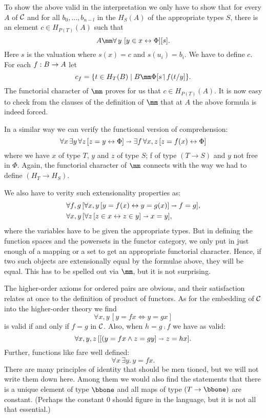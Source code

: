 To show the above valid in the interpretation we only have to show that for every $A$ of
$\mathcal C$ and for all $b_0, \dots ,b_{n-l}$ in the $H_S(A)$ of the appropriate types $S$, there
is an element $c \in H_{P(T)}(A)$ such that
$$
A \mm \forall\, y \,\, [y \in x \iff \Phi][s] .
$$
%
Here $s$ is the valuation where $s(x) = c$ and $s(u_i) = b_i$. We have to define $c$. For
each $f: B \rightarrow A$ let
$$
c_f = \{t \in H_T(B) \mid B \mm \Phi [s \res f(t/y] \} .
$$
%
The functorial character of $\mm$ proves for us that $c \in H_{P(T)}(A)$. It is now easy
to check from the clauses of the definition of $\mm$ that at $A$ the above formula is
indeed forced.

In a similar way we can verify the functional version of comprehension:
$$
\forall x \, \exists y \, \forall z \, [ z = y \leftrightarrow \Phi] \shortrightarrow \exists f\, \forall x,z\, [z = f(x) \leftrightarrow \Phi ]
$$
%
where we have $x$ of type $T$, $y$ and $z$ of type $S$; f of type $(T\to S)$ and $y$ not
free in $\Phi$. Again, the functorial character of $\mm$ connects with the way we had to
define $(H_T \to H_S)$.

We also have to verity such extensionality properties as:
\begin{align*}
&\forall f,g \, [\forall x,y \, [ y = f(x) \leftrightarrow y = g(x) ] \shortrightarrow f = g],\\
&\forall x,y \, [\forall z \, [ z \in x \leftrightarrow z \in y ] \shortrightarrow x = y],
\end{align*}
%
where the variables have to be given the appropriate types. But in defining the function
spaces and the powersets in the functor category, we only put in just enough of a mapping
or a set to get an appropriate functorial character. Hence, if two such objects are
extensionally equal by the formulae above, they will be equal. This has to be spelled out
via $\mm$, but it is not surprising.

The higher-order axioms for ordered pairs are obvious, and their satisfaction relates at
once to the definition of product of functors. As for the embedding of $\mathcal C$ into the
higher-order theory we find
$$
\forall x,y \, [y = f x \iff y = gx]
$$
is valid if and only if $f = g$ in $\mathcal C$. Also, when $h = g \comp f$ we have as valid:
$$
\forall x,y,z\, [[(y = fx \land z = gy] \shortrightarrow z = hx].
$$
Further, functions like fare well defined:
$$
\forall x\, \exists y.\, y = fx .
$$
There are many principles of identity that should be men tioned, but we will not write
them down here. Among them we would also find the statements that there is a unique
element of type $\bbone$ and all maps of type $(T\to \bbone )$ are constant. (Perhaps the
constant 0 should figure in the language, but it is not all that essential.)

